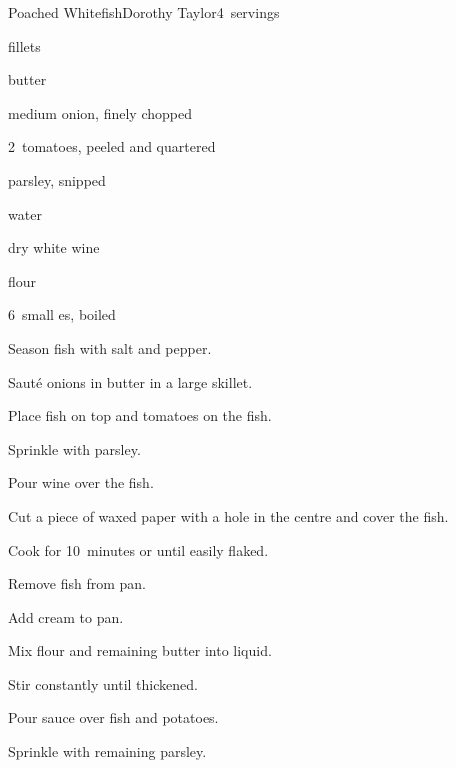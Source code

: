\begin{recipe}{Poached Whitefish}{Dorothy Taylor}{4~servings}

\begin{ingredients}
\item \lbs{1\threequarter}  fillets
\item {}
\item {}
\item {} butter
\item medium onion, finely chopped
\item 2~tomatoes, peeled and quartered
\item \C{\quarter} parsley, snipped
\item \C{\third} water
\item \C{\third} dry white wine
\item \C{\third} 
\item {} flour
\item 6~small es, boiled
\end{ingredients}

\begin{directions}
\item Season fish with salt and pepper.
\item Saut\'e onions in  butter in a large skillet.
\item Place fish on top and tomatoes on the fish.
\item Sprinkle with  parsley.
\item Pour wine over the fish.
\item Cut a piece of waxed paper with a hole in the centre and cover the fish.
\item Cook for 10~minutes or until easily flaked.
\item Remove fish from pan.
\item Add cream to pan.
\item Mix flour and remaining butter into liquid.
\item Stir constantly until thickened.
\item Pour sauce over fish and potatoes.
\item Sprinkle with remaining parsley.
\end{directions}

\end{recipe}
